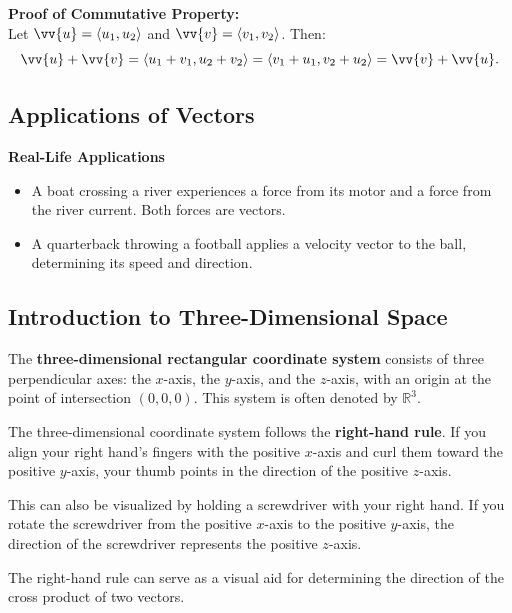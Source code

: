 \documentclass{article}
\begin{document}
\begin{proofbox}
    \textbf{Proof of Commutative Property:} \\
    Let \(\vv{u} = \langle u_1, u_2 \rangle\) and \(\vv{v} = \langle v_1, v_2 \rangle\). Then:
    \[
    \vv{u} + \vv{v} = \langle u_1 + v_1, u_2 + v_2 \rangle = \langle v_1 + u_1, v_2 + u_2 \rangle = \vv{v} + \vv{u}.
    \]
\end{proofbox}

\subsection*{Applications of Vectors}

\begin{examplebox}
    \textbf{Real-Life Applications}
    \begin{itemize}
        \item A boat crossing a river experiences a force from its motor and a force from the river current. Both forces are vectors.
        \item A quarterback throwing a football applies a velocity vector to the ball, determining its speed and direction.
    \end{itemize}
\end{examplebox}

\subsection*{Introduction to Three-Dimensional Space}

The \textbf{three-dimensional rectangular coordinate system} consists of three perpendicular axes: the \(x\)-axis, the \(y\)-axis, and the \(z\)-axis, with an origin at the point of intersection \((0, 0, 0)\). This system is often denoted by \(\mathbb{R}^3\).

\begin{tipbox}
    The three-dimensional coordinate system follows the \textbf{right-hand rule}. If you align your right hand’s fingers with the positive \(x\)-axis and curl them toward the positive \(y\)-axis, your thumb points in the direction of the positive \(z\)-axis.
    \begin{remarkbox}
        This can also be visualized by holding a screwdriver with your right hand. If you rotate the screwdriver from the positive \(x\)-axis to the positive \(y\)-axis, the direction of the screwdriver represents the positive \(z\)-axis.
    \end{remarkbox}
    \begin{notebox}
        The right-hand rule can serve as a visual aid for determining the direction of the cross product of two vectors.
    \end{notebox}
\end{tipbox}
\end{document}

